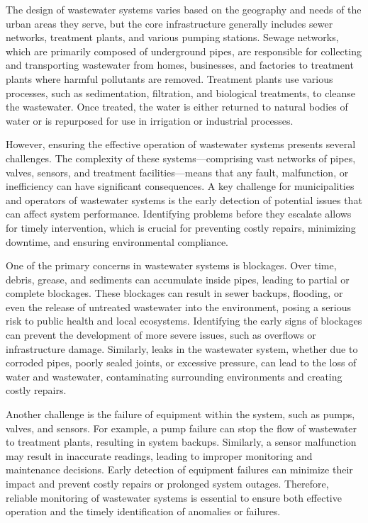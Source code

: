 \documentclass[conference]{IEEEtran}
\begin{document}
The design of wastewater systems varies based on the geography and needs of the urban areas they serve, but the core infrastructure generally includes sewer networks, treatment plants, and various pumping stations. Sewage networks, which are primarily composed of underground pipes, are responsible for collecting and transporting wastewater from homes, businesses, and factories to treatment plants where harmful pollutants are removed. Treatment plants use various processes, such as sedimentation, filtration, and biological treatments, to cleanse the wastewater. Once treated, the water is either returned to natural bodies of water or is repurposed for use in irrigation or industrial processes.

However, ensuring the effective operation of wastewater systems presents several challenges. The complexity of these systems—comprising vast networks of pipes, valves, sensors, and treatment facilities—means that any fault, malfunction, or inefficiency can have significant consequences. A key challenge for municipalities and operators of wastewater systems is the early detection of potential issues that can affect system performance. Identifying problems before they escalate allows for timely intervention, which is crucial for preventing costly repairs, minimizing downtime, and ensuring environmental compliance.

One of the primary concerns in wastewater systems is blockages. Over time, debris, grease, and sediments can accumulate inside pipes, leading to partial or complete blockages. These blockages can result in sewer backups, flooding, or even the release of untreated wastewater into the environment, posing a serious risk to public health and local ecosystems. Identifying the early signs of blockages can prevent the development of more severe issues, such as overflows or infrastructure damage. Similarly, leaks in the wastewater system, whether due to corroded pipes, poorly sealed joints, or excessive pressure, can lead to the loss of water and wastewater, contaminating surrounding environments and creating costly repairs.

Another challenge is the failure of equipment within the system, such as pumps, valves, and sensors. For example, a pump failure can stop the flow of wastewater to treatment plants, resulting in system backups. Similarly, a sensor malfunction may result in inaccurate readings, leading to improper monitoring and maintenance decisions. Early detection of equipment failures can minimize their impact and prevent costly repairs or prolonged system outages. Therefore, reliable monitoring of wastewater systems is essential to ensure both effective operation and the timely identification of anomalies or failures.
\end{document}
